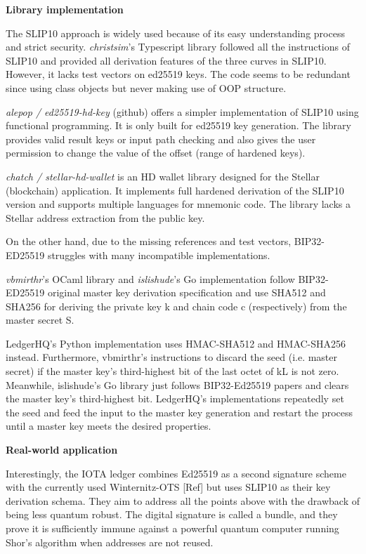 \bigskip
{\textbf{Library implementation}}

The SLIP10 approach is widely used because of its easy understanding process and strict security. \textit{christsim}'s Typescript library \cite{christsim} followed all the instructions of SLIP10 and provided all derivation features of the three curves in SLIP10. However, it lacks test vectors on ed25519 keys. The code seems to be redundant since using class objects but never making use of OOP structure.

\textit{alepop / ed25519-hd-key} (github) \cite{alepop} offers a simpler implementation of SLIP10 using functional programming. It is only built for ed25519 key generation. The library provides valid result keys or input path checking and also gives the user permission to change the value of the offset (range of hardened keys).

\textit{chatch / stellar-hd-wallet} is an HD wallet library designed for the Stellar (blockchain) application. It implements full hardened derivation of the SLIP10 version and supports multiple languages for mnemonic code. The library lacks a Stellar address extraction from the public key.

On the other hand, due to the missing references and test vectors, BIP32-ED25519 struggles with many incompatible implementations.

\textit{vbmirthr}'s OCaml library \cite{vinc} and \textit{islishude}'s Go implementation \cite{Shude} follow BIP32-ED25519 original master key derivation specification and use SHA512 and SHA256 for deriving the private key k and chain code c (respectively) from the master secret S.

LedgerHQ's Python implementation \cite{LedgerHQ} uses HMAC-SHA512 and HMAC-SHA256 instead.
Furthermore, vbmirthr's instructions to discard the seed (i.e. master secret) if the master key's third-highest bit of the last octet of kL is not zero. Meanwhile, islishude's Go library just follows BIP32-Ed25519 papers and clears the master key's third-highest bit. LedgerHQ's implementations repeatedly set the seed and feed the input to the master key generation and restart the process until a master key meets the desired properties.


\bigskip
{\textbf{Real-world application}}

Interestingly, the IOTA ledger combines Ed25519 as a second signature scheme with the currently used Winternitz-OTS [Ref] but uses SLIP10 as their key derivation schema.
They aim to address all the points above with the drawback of being less quantum robust. The digital signature is called a bundle, and they prove it is sufficiently immune against a powerful quantum computer running Shor’s algorithm \cite{shor} when addresses are not reused.

